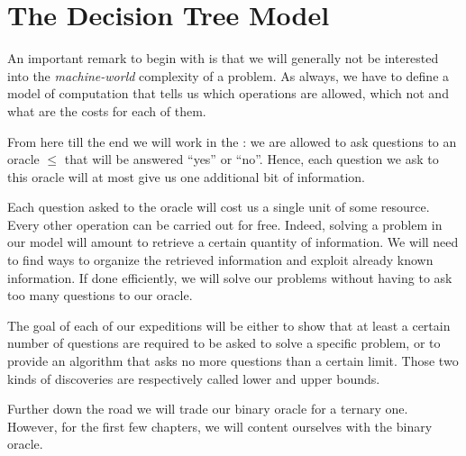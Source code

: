 \section{The Decision Tree Model}
\label{tree:sorting:model}

An important remark to begin with is that we will generally not be interested
into the \emph{machine-world} complexity of a problem. As always, we have to
define a model of computation that tells us which operations are allowed, which
not and what are the costs for each of them.

From here till the end we will work in the :
we are allowed to ask questions to an oracle \(\le\) that will be answered
``yes'' or ``no''. Hence, each question we ask to this oracle will at most give
us one additional bit of information.

Each question asked to the oracle will cost us a single unit of some resource.
Every other operation can be carried out for free. Indeed, solving a problem in
our model will amount to retrieve a certain quantity of information. We will
need to find ways to organize the retrieved information and exploit already
known information. If done efficiently, we will solve our problems without
having to ask too many questions to our oracle.

The goal of each of our expeditions will be either to show that at least a
certain number of questions are required to be asked to solve a specific
problem, or to provide an algorithm that asks no more questions than a certain
limit. Those two kinds of discoveries are respectively called lower and upper
bounds.

Further down the road we will trade our binary oracle for a ternary one.
However, for the first few chapters, we will content ourselves with the binary
oracle.

